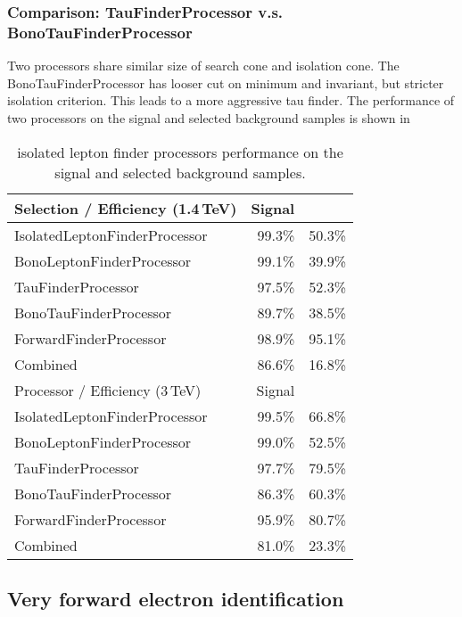 \subsubsection{Comparison: TauFinderProcessor v.s. BonoTauFinderProcessor}

Two processors share similar size of search cone and isolation cone. The BonoTauFinderProcessor has looser cut on minimum \pT and invariant, but stricter isolation criterion. This leads to a more aggressive tau finder. The performance of two processors on the signal and selected background samples is shown in 

\begin{table}
\begin{tabular}{lrr}
\hline
\hline
Selection / Efficiency (1.4\,TeV)  &  Signal & \HepProcess{\Pquark\Pquark\Pquark\Pquark\Plepton\Pnu} \\
\hline
IsolatedLeptonFinderProcessor & 99.3\% & 50.3\%  \\
BonoLeptonFinderProcessor & 99.1\% & 39.9\%  \\
TauFinderProcessor & 97.5\% & 52.3\%  \\
BonoTauFinderProcessor & 89.7\% & 38.5\%  \\
ForwardFinderProcessor & 98.9\% & 95.1\%  \\
Combined & 86.6\% & 16.8\%  \\
\hline
Processor / Efficiency (3\,TeV)  &  Signal  & \HepProcess{\Pquark\Pquark\Pquark\Pquark\Plepton\Pnu} \\
\hline
IsolatedLeptonFinderProcessor & 99.5\% & 66.8\%  \\
BonoLeptonFinderProcessor & 99.0\% & 52.5\%  \\
TauFinderProcessor & 97.7\% & 79.5\%  \\
BonoTauFinderProcessor & 86.3\% & 60.3\%  \\
ForwardFinderProcessor & 95.9\% & 80.7\%  \\
Combined & 81.0\% & 23.3\%  \\


\hline

\end{tabular}
\caption{isolated lepton finder processors performance on the signal and selected background samples.}
\label{tab:doubleHiggsIsoLepPerformance}
\end{table}

\subsection{Very forward electron identification}

